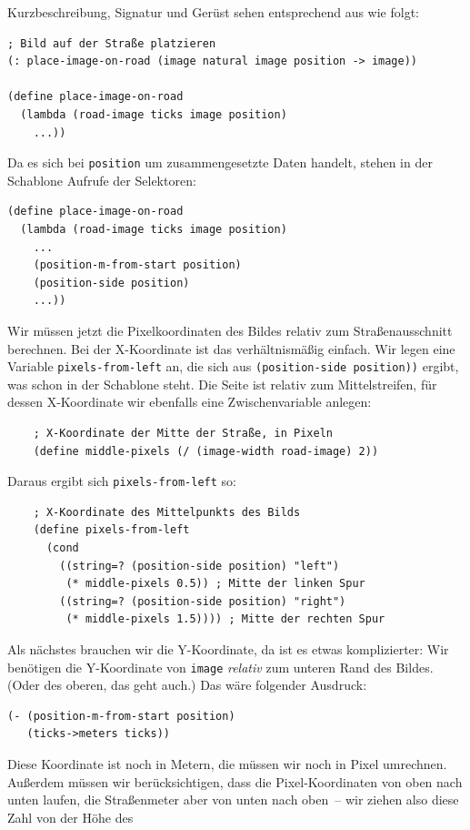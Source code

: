 Kurzbeschreibung, Signatur und Gerüst sehen entsprechend aus wie
folgt:
%
\begin{lstlisting}
; Bild auf der Straße platzieren
(: place-image-on-road (image natural image position -> image))

(define place-image-on-road
  (lambda (road-image ticks image position)
    ...))
\end{lstlisting}
%
Da es sich bei \lstinline{position} um zusammengesetzte Daten handelt,
stehen in der Schablone Aufrufe der Selektoren:
%
\begin{lstlisting}
(define place-image-on-road
  (lambda (road-image ticks image position)
    ...
    (position-m-from-start position)
    (position-side position)
    ...))
\end{lstlisting}
%
Wir müssen jetzt die Pixelkoordinaten des Bildes relativ zum
Straßenausschnitt berechnen.  Bei der X-Koordinate ist das
verhältnismäßig einfach.  Wir legen eine Variable 
\lstinline{pixels-from-left} an, die sich aus 
\lstinline{(position-side position))} ergibt, 
was schon in der Schablone steht.  Die Seite
ist relativ zum Mittelstreifen, für dessen X-Koordinate wir ebenfalls
eine Zwischenvariable anlegen:
%
\begin{lstlisting}
    ; X-Koordinate der Mitte der Straße, in Pixeln
    (define middle-pixels (/ (image-width road-image) 2))
\end{lstlisting}
%
Daraus ergibt sich \lstinline{pixels-from-left} so:
%
\begin{lstlisting}
    ; X-Koordinate des Mittelpunkts des Bilds
    (define pixels-from-left
      (cond
        ((string=? (position-side position) "left")
         (* middle-pixels 0.5)) ; Mitte der linken Spur
        ((string=? (position-side position) "right")
         (* middle-pixels 1.5)))) ; Mitte der rechten Spur
\end{lstlisting}
%
Als nächstes brauchen wir die Y-Koordinate, da ist es etwas
komplizierter: Wir benötigen die Y-Koordinate von \lstinline{image}
\emph{relativ} zum unteren Rand des Bildes.  (Oder des oberen, das
geht auch.)  Das wäre folgender Ausdruck:
%
\begin{lstlisting}
(- (position-m-from-start position)
   (ticks->meters ticks))
\end{lstlisting}
%
Diese Koordinate ist noch in Metern, die müssen wir noch in Pixel
umrechnen.  Außerdem müssen wir berücksichtigen, dass die
Pixel-Koordinaten von oben nach unten laufen, die Straßenmeter aber
von unten nach oben~-- wir ziehen also diese Zahl von der Höhe des
